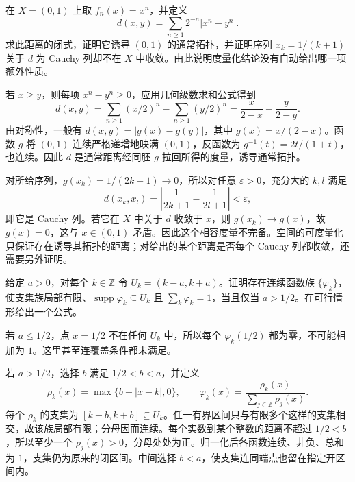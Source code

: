 \begin{exercise}\label{g1:ex:compatible-metric-incomplete}
	在 \(X=(0,1)\) 上取 \(f_n(x)=x^n\)，并定义
	\[
		d(x,y)=\sum_{n\ge1}2^{-n}|x^n-y^n|.
	\]
	求此距离的闭式，证明它诱导 \((0,1)\) 的通常拓扑，并证明序列 \(x_k=1/(k+1)\) 关于 \(d\) 为 Cauchy 列却不在 \(X\) 中收敛。由此说明度量化结论没有自动给出哪一项额外性质。
\end{exercise}
\begin{solution}
	若 \(x\ge y\)，则每项 \(x^n-y^n\ge0\)，应用几何级数求和公式得到
	\[
		d(x,y)=\sum_{n\ge1}(x/2)^n-\sum_{n\ge1}(y/2)^n
		=\frac{x}{2-x}-\frac{y}{2-y}.
	\]
	由对称性，一般有 \(d(x,y)=|g(x)-g(y)|\)，其中 \(g(x)=x/(2-x)\)。函数 \(g\) 将 \((0,1)\) 连续严格递增地映满 \((0,1)\)，反函数为 \(g^{-1}(t)=2t/(1+t)\)，也连续。因此 \(d\) 是通常距离经同胚 \(g\) 拉回所得的度量，诱导通常拓扑。

	对所给序列，\(g(x_k)=1/(2k+1)\to0\)，所以对任意 \(\varepsilon>0\)，充分大的 \(k,l\) 满足
	\[
		d(x_k,x_l)=\left|\frac1{2k+1}-\frac1{2l+1}\right|<\varepsilon,
	\]
	即它是 Cauchy 列。若它在 \(X\) 中关于 \(d\) 收敛于 \(x\)，则 \(g(x_k)\to g(x)\)，故 \(g(x)=0\)，这与 \(x\in(0,1)\) 矛盾。因此这个相容度量不完备。空间的可度量化只保证存在诱导其拓扑的距离；对给出的某个距离是否每个 Cauchy 列都收敛，还需要另外证明。
\end{solution}

\begin{exercise}\label{g1:ex:interval-partition-width}
	给定 \(a>0\)，对每个 \(k\in\mathbb Z\) 令 \(U_k=(k-a,k+a)\)。证明存在连续函数族 \(\{\varphi_k\}\)，使支集族局部有限、\(\operatorname{supp}\varphi_k\subseteq U_k\) 且 \(\sum_k\varphi_k=1\)，当且仅当 \(a>1/2\)。在可行情形给出一个公式。
\end{exercise}
\begin{solution}
	若 \(a\le1/2\)，点 \(x=1/2\) 不在任何 \(U_k\) 中，所以每个 \(\varphi_k(1/2)\) 都为零，不可能相加为 \(1\)。这里甚至连覆盖条件都未满足。

	若 \(a>1/2\)，选择 \(b\) 满足 \(1/2<b<a\)，并定义
	\[
		\rho_k(x)=\max\{b-|x-k|,0\},\qquad
		\varphi_k(x)=\frac{\rho_k(x)}{\sum_{j\in\mathbb Z}\rho_j(x)}.
	\]
	每个 \(\rho_k\) 的支集为 \([k-b,k+b]\subseteq U_k\)。任一有界区间只与有限多个这样的支集相交，故该族局部有限；分母因而连续。每个实数到某个整数的距离不超过 \(1/2<b\)，所以至少一个 \(\rho_j(x)>0\)，分母处处为正。归一化后各函数连续、非负、总和为 \(1\)，支集仍为原来的闭区间。中间选择 \(b<a\)，使支集连同端点也留在指定开区间内。
\end{solution}

